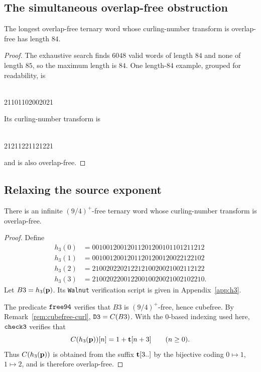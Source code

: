 \documentclass[12pt,reqno]{article}
\begin{document}
\subsection{The simultaneous overlap-free obstruction}

\begin{theorem} 
The longest overlap-free ternary word whose curling-number transform is overlap-free has length $84$.
\label{thm:ternary-overlap-max}
\end{theorem}

\begin{proof} 
The exhaustive search finds $6048$ valid words of length $84$ and none of length $85$, so the maximum length is $84$.  One length-$84$ example, grouped for readability, is
\begin{center}
\small{}\\
21101102002021
\end{center}
Its curling-number transform is
\begin{center}
\small{}\\
21211221121221
\end{center}
and is also overlap-free.
\end{proof}

\subsection{Relaxing the source exponent}

\begin{theorem} 
\label{thm:ternary-94plus-overlap}
There is an infinite $(9/4)^+$-free ternary word whose curling-number transform is overlap-free. 
\end{theorem}

\begin{proof} 
Define
\begin{align*} 
h_3(0) &= 00100120012011201200101101211212 \\
h_3(1) &= 00100120012011201200120022122102 \\
h_3(2) &= 21002022021221210020021002112122 \\
h_3(3) &= 21002022001220010020021002102210 .
\end{align*}
Let $B3=h_3({\bf p})$.  Its {\tt Walnut} verification script is given in Appendix~\ref{app:h3}.

The predicate ${\tt free94}$ verifies that $B3$ is $(9/4)^+$-free, hence cubefree.  By Remark~\ref{rem:cubefree-curl}, ${\tt D3}=C(B3)$.  With the $0$-based indexing used here, ${\tt check3}$ verifies that
\[
C(h_3({\bf p}))[n]=1+{\bf t}[n+3]\qquad(n\ge 0).
\]
Thus $C(h_3({\bf p}))$ is obtained from the suffix ${\bf t}[3..]$ by the bijective coding $0\mapsto1$, $1\mapsto2$, and is therefore overlap-free.
\end{proof}
\end{document}
